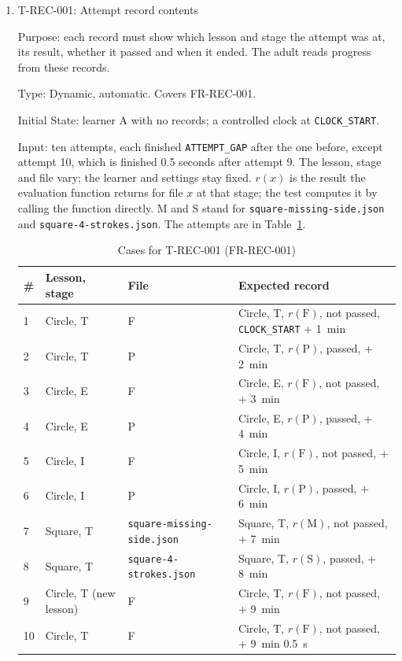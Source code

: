 \documentclass[12pt, titlepage]{article}
\newcommand{\testitem}[1]{\item #1\par\nopagebreak}
\begin{document}
\begin{enumerate}

\testitem{T-REC-001: Attempt record contents}

Purpose: each record must show which lesson and stage the attempt was at,
its result, whether it passed and when it ended. The adult reads progress
from these records.

Type: Dynamic, automatic. Covers FR-REC-001.

Initial State: learner A with no records; a controlled clock at
\texttt{CLOCK\_START}.

Input: ten attempts, each finished \texttt{ATTEMPT\_GAP} after the one
before, except attempt 10, which is finished 0.5 seconds after attempt 9.
The lesson, stage and file vary; the learner and settings stay fixed.
$r(x)$ is the result the evaluation function returns for file $x$ at that
stage; the test computes it by calling the function directly. M and S stand
for \texttt{square-\allowbreak{}missing-\allowbreak{}side.json} and
\texttt{square-\allowbreak{}4-\allowbreak{}strokes.json}. The attempts are
in Table~\ref{tab:t-rec-001}.

\begin{table}[htbp]
\centering\small
\caption{Cases for T-REC-001 (FR-REC-001)}
\label{tab:t-rec-001}
\begin{tabularx}{\textwidth}{@{}l l >{\raggedright\arraybackslash}X
  >{\raggedright\arraybackslash}X@{}}
\toprule
\textbf{\#} & \textbf{Lesson, stage} & \textbf{File} &
\textbf{Expected record}\\
\midrule
1 & Circle, T & F & Circle, T, $r(\mathrm{F})$, not passed,
\texttt{CLOCK\_START} + 1~min\\
2 & Circle, T & P & Circle, T, $r(\mathrm{P})$, passed, + 2~min\\
3 & Circle, E & F & Circle, E, $r(\mathrm{F})$, not passed, + 3~min\\
4 & Circle, E & P & Circle, E, $r(\mathrm{P})$, passed, + 4~min\\
5 & Circle, I & F & Circle, I, $r(\mathrm{F})$, not passed, + 5~min\\
6 & Circle, I & P & Circle, I, $r(\mathrm{P})$, passed, + 6~min\\
7 & Square, T & \texttt{square-\allowbreak{}missing-\allowbreak{}side.json}
& Square, T, $r(\mathrm{M})$, not passed, + 7~min\\
8 & Square, T & \texttt{square-\allowbreak{}4-\allowbreak{}strokes.json} &
Square, T, $r(\mathrm{S})$, passed, + 8~min\\
9 & Circle, T (new lesson) & F & Circle, T, $r(\mathrm{F})$, not passed,
+ 9~min\\
10 & Circle, T & F & Circle, T, $r(\mathrm{F})$, not passed, + 9~min
0.5~s\\
\bottomrule
\end{tabularx}
\end{table}


\end{enumerate}
\end{document}
